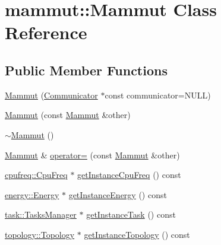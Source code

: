 \hypertarget{classmammut_1_1Mammut}{\section{mammut\-:\-:Mammut Class Reference}
\label{classmammut_1_1Mammut}
}
\subsection*{Public Member Functions}
\begin{DoxyCompactItemize}
\item 
\hyperlink{classmammut_1_1Mammut_a9969f1d5c17e793629a9054523e47078}{Mammut} (\hyperlink{classmammut_1_1Communicator}{Communicator} $\ast$const communicator=N\-U\-L\-L)
\item 
\hyperlink{classmammut_1_1Mammut_acdb713bc158da89c42e07f936e2bdaf1}{Mammut} (const \hyperlink{classmammut_1_1Mammut}{Mammut} \&other)
\item 
\hyperlink{classmammut_1_1Mammut_a7de89ade46172cb5e10ee622cf03cf62}{$\sim$\-Mammut} ()
\item 
\hyperlink{classmammut_1_1Mammut}{Mammut} \& \hyperlink{classmammut_1_1Mammut_a37d723a824065b72c966fee34451134e}{operator=} (const \hyperlink{classmammut_1_1Mammut}{Mammut} \&other)
\item 
\hyperlink{classmammut_1_1cpufreq_1_1CpuFreq}{cpufreq\-::\-Cpu\-Freq} $\ast$ \hyperlink{classmammut_1_1Mammut_a258b4873f865cfb00fd93a3b9f9e03eb}{get\-Instance\-Cpu\-Freq} () const 
\item 
\hyperlink{classmammut_1_1energy_1_1Energy}{energy\-::\-Energy} $\ast$ \hyperlink{classmammut_1_1Mammut_ab0d1ee01ca99a7e97421fded8574bef0}{get\-Instance\-Energy} () const 
\item 
\hyperlink{classmammut_1_1task_1_1TasksManager}{task\-::\-Tasks\-Manager} $\ast$ \hyperlink{classmammut_1_1Mammut_aee1a2c1c4f5f90bb7a0bb4a52491b740}{get\-Instance\-Task} () const 
\item 
\hyperlink{classmammut_1_1topology_1_1Topology}{topology\-::\-Topology} $\ast$ \hyperlink{classmammut_1_1Mammut_a2dcf3817c47012f59b685b895533c74d}{get\-Instance\-Topology} () const 
\end{DoxyCompactItemize}


